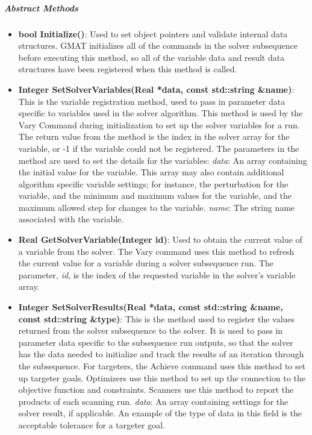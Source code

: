 \subparagraph{\textit{Abstract Methods}}
\begin{itemize}
\item \textbf{bool Initialize()}: Used to set object pointers and validate internal data
structures.  GMAT initializes all of the commands in the solver subsequence before executing this
method, so all of the variable data and result data structures have been registered when this method
is called.
\item \textbf{Integer SetSolverVariables(Real *data, const std::string \&name)}: This is the
variable registration method, used to pass in parameter data specific to variables used in the
solver algorithm.  This method is used by the Vary Command during initialization to set up the
solver variables for a run.  The return value from the method is the index in the solver array for
the variable, or -1 if the variable could not be registered.  The parameters in the method are used
to set the details for the variables:
\subitem \textit{data}: An array containing the initial value for the variable. This array may also
contain additional algorithm specific variable settings; for instance, the perturbation for the
variable, and the minimum and maximum values for the variable, and the maximum allowed step for
changes to the variable.
\subitem \textit{name}: The string name associated with the variable.
\item \textbf{Real GetSolverVariable(Integer id)}: Used to obtain the current value of a variable
from the solver.  The Vary command uses this method to refresh the current value for a variable
during a solver subsequence run.  The parameter, \textit{id}, is the index of the requested
variable in the solver's variable array.
\item \textbf{Integer SetSolverResults(Real *data, const std::string \&name, const std::string
\&type)}: This is the method used to register the values returned from the solver subsequence to
the solver.  It is used to pass in parameter data specific to the subsequence run outputs, so that
the solver has the data needed to initialize and track the results of an iteration through the
subsequence.  For targeters, the Achieve command uses this method to set up targeter goals.
Optimizers use this method to set up the connection to the objective function and constraints.
Scanners use this method to report the products of each scanning run.
\subitem \textit{data}: An array containing settings for the solver result, if applicable. An
example of the type of data in this field is the acceptable tolerance for a targeter goal.

\end{itemize}
